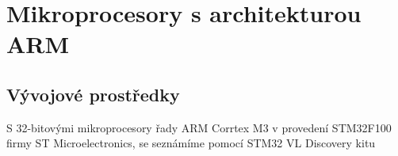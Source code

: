 \chapter{Mikroprocesory s architekturou ARM }
\minitoc
\newpage
\section{Vývojové prostředky}
  S 32-bitovými mikroprocesory řady ARM Corrtex M3 v provedení STM32F100 firmy ST Microelectronics, se 
  seznámíme pomocí STM32 VL Discovery kitu
